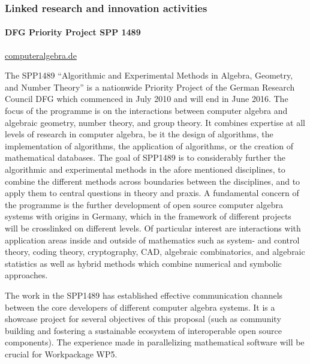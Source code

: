 
\subsubsection{Linked research and innovation activities}



\paragraph{DFG Priority Project SPP 1489}
\url{computeralgebra.de}

The SPP1489 ``Algorithmic and Experimental Methods in Algebra, Geometry, and
Number Theory'' is a nationwide Priority Project of the German Research Council DFG  
which commenced in July  2010 and will end in June 2016. The focus of the programme 
is on the interactions between computer algebra and algebraic geometry, number theory, 
and group theory. It combines expertise at all levels of research in computer algebra, 
be it the design of algorithms, the implementation of algorithms, the application
of algorithms, or the creation of mathematical databases. The goal of SPP1489 is to 
considerably further the algorithmic and experimental methods in the afore mentioned
disciplines, to combine the different methods across boundaries between the disciplines, 
and to apply them to central questions in theory and praxis. A fundamental concern of the
programme is the further development of open source
computer algebra systems with origins in Germany, which in
the framework of different projects will be crosslinked on
different levels. Of particular interest are interactions with application areas inside
and outside of mathematics such as system- and control theory, coding
theory, cryptography, CAD, algebraic combinatorics, and algebraic
statistics as well as hybrid methods which combine numerical and
symbolic approaches. 

The work in the SPP1489 has established effective communication channels between 
the core developers of different computer algebra systems. It is a showcase project
for several objectives of this proposal (such as community building and
fostering a sustainable ecosystem of interoperable open source components). 
The experience made in parallelizing mathematical software will be crucial for
Workpackage WP5.



